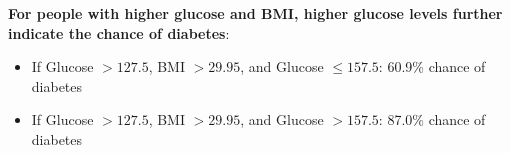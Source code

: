 \documentclass{article}
\begin{document}
\begin{enumerate}[leftmargin=\labelsep]
    \textbf{For people with higher glucose and BMI, higher glucose levels further indicate the chance of diabetes}:
    \begin{itemize}
        \item If Glucose $> 127.5$, BMI $> 29.95$, and Glucose $\leq 157.5$: 60.9\% chance of diabetes
        \item If Glucose $> 127.5$, BMI $> 29.95$, and Glucose $> 157.5$: 87.0\% chance of diabetes
    \end{itemize}


\end{enumerate}

\end{document}
